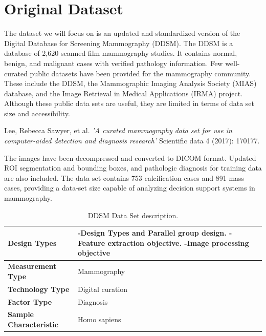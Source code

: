 \documentclass{book}
\begin{document}
        \section{Original Dataset}
        The dataset we will focus on is an updated and standardized version of the Digital Database for Screening Mammography (DDSM). The DDSM is a database of 2,620 scanned film mammography studies. It contains normal, benign, and malignant cases with verified pathology information. Few well-curated public datasets have been provided for the mammography community. These include the DDSM, the Mammographic Imaging Analysis Society (MIAS) database, and the Image Retrieval in Medical Applications (IRMA) project. Although these public data sets are useful, they are limited in terms of data set size and accessibility.

        \begin{center}
            \begin{minipage}{0.9\linewidth}
                \vspace{5pt}%
                {\small
                    Lee, Rebecca Sawyer, et al. \textit{'A curated mammography data set for use in computer-aided detection and diagnosis research'} Scientific data 4 (2017): 170177.
                }
                \vspace{5pt}%
            \end{minipage}
        \end{center}

        The images have been decompressed and converted to DICOM format. Updated ROI segmentation and bounding boxes, and pathologic diagnosis for training data are also included. The data set contains 753 calcification cases and 891 mass cases, providing a data-set size capable of analyzing decision support systems in mammography.

        
        \begin{table}
            \begin{tabular}{m{5cm}m{8cm}}
                \midrule
                \textbf{Design Types} & -Design Types and Parallel group design.  -Feature extraction objective.  -Image processing objective \\
                \midrule
                \textbf{Measurement Type} & Mammography \\ 
                \midrule
                \textbf{Technology Type} & Digital curation \\ 
                \midrule
                \textbf{Factor Type} & Diagnosis \\
                \midrule
                \textbf{Sample Characteristic} & Homo sapiens\\
                \midrule
            \end{tabular}
            \caption{\label{tab:DDSM}DDSM Data Set description.}
        \end{table}
\end{document}

